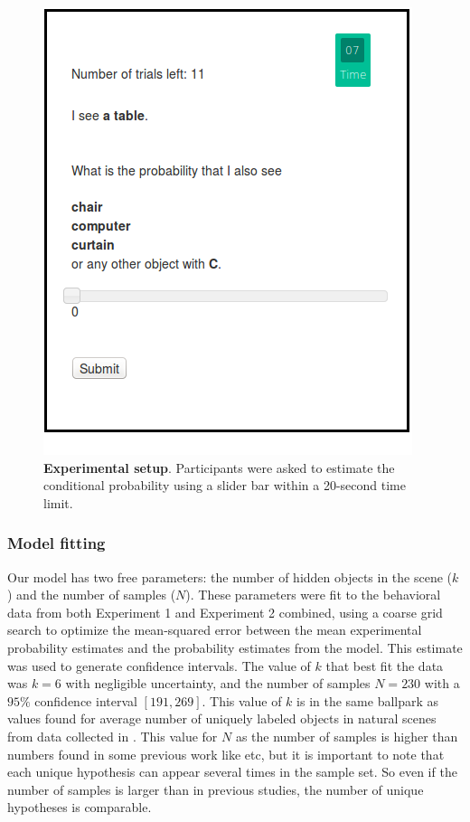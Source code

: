 \begin{figure}[ht!]
\centering
\includegraphics[scale=0.9]{figures/screenshot.png}
\caption{\textbf{Experimental setup}. Participants were asked to estimate the conditional probability using a slider bar within a 20-second time limit.}
\label{fig:screenshot}
\end{figure}

\subsubsection{Model fitting}
Our model has two free parameters: the number of hidden objects in the scene ($k$) and the number of samples ($N$). These parameters were fit to the behavioral data from both Experiment 1 and Experiment 2 combined, using a coarse grid search to optimize the mean-squared error between the mean experimental probability estimates and the probability estimates from the model.
 This estimate was used to generate confidence intervals.
The value of $k$ that best fit the data was $k=6$ with negligible uncertainty, and the number of samples $N = 230$ with a $95\%$ confidence interval $[191, 269]$. 
This value of $k$ is in the same ballpark as values found for average number of uniquely labeled objects in natural scenes from data collected in \citet{greene13}. This value for $N$ as the number of samples is higher than numbers found in some previous work like \citet{Vul2014} etc, but it is important to note that each unique hypothesis can appear several times in the sample set. So even if the number of samples is larger than in previous studies, the number of unique hypotheses is comparable.

